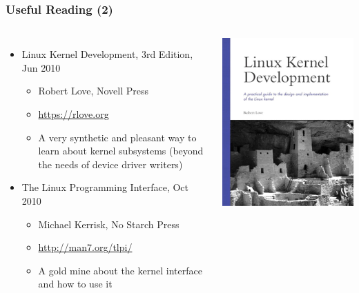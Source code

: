 \begin{frame}
  \frametitle{Useful Reading (2)}
  \begin{columns}
    \begin{itemize}
    \item Linux Kernel Development, 3rd Edition, Jun 2010
      \begin{itemize}
      \item Robert Love, Novell Press
      \item \url{https://rlove.org}
      \item A very synthetic and pleasant way to learn about kernel
        subsystems (beyond the needs of device driver writers)
      \end{itemize}
    \item The Linux Programming Interface, Oct 2010
      \begin{itemize}
      \item Michael Kerrisk, No Starch Press
      \item \url{http://man7.org/tlpi/}
      \item A gold mine about the kernel interface and how to use it
      \end{itemize}
    \end{itemize}
    \begin{center}
      \includegraphics[height=0.4\textheight]{slides/kernel-resources-references/linux-kernel-development.jpg}\\

\end{center}
\end{columns}
\end{frame}
